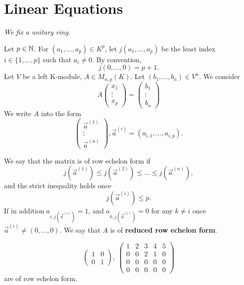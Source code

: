 \documentclass{book}
\numberwithin{equation}{section}
\begin{document}
\section{Linear Equations}
{\large\textit{We fix a unitary ring.}}
\begin{definitionenv}
    Let $p\in \mathbb{N}$. For $(a_1,\dots,a_p)\in K^p$, let $j(a_1,\dots,a_p)$ be the least index $i\in\{1,\dots,p\}$ such that $a_i\not=0$. By convention,
    $$j(0,\dots,0)=p+1.$$
    Let $V$ be a left K-module, $A\in M_{n,p}(K)$. Let $(b_1,\dots , b_n)\in V^n$. We consider
\begin{equation*}
A\begin{pmatrix}
 x_1\\
 \vdots\\
x_p
\end{pmatrix}=\begin{pmatrix}
 b_1\\
 \vdots\\
b_n
\end{pmatrix}\tag{$*$}
\end{equation*}
We write $A$ into the form
$$\begin{pmatrix}
 \vec{a}^{(1)} \\
 \vdots\\
 \vec{a}^{(n)}
\end{pmatrix}, \vec{a}^{(i)}=(a_{i,1},\dots,a_{i,p}).$$
\end{definitionenv}
\begin{definitionenv}
    We say that the matrix is of row echelon form if 
    $$j\left(\vec{a}^{(1)}\right)\le j\left(\vec{a}^{(2)}\right)\le \dots\le j\left(\vec{a}^{(n)}\right),$$
    and the strict inequality holds once $$j\left(\vec{a}^{(i)}\right)\le p.$$
    If in addition $a_{i,j\left(\vec{a}^{(i)}\right)}=1$,  and $a_{k,j\left(\vec{a}^{(i)}\right)}=0$ for any $k\not=i$ once $\vec{a}^{(i)}\not=(0,\dots,0)$. We say that $A$ is of \textbf{reduced row echelon form}. 
\end{definitionenv}
\begin{exampleenv}
    $$
    \begin{pmatrix}
        1&0\\
        0&1
    \end{pmatrix},\ 
\begin{pmatrix}
  1&2  &3  &4  &5 \\
  0& 0 &2  &1  &0 \\
  0& 0 &0  & 0 &0 \\
  0& 0 &  0&  0&0
\end{pmatrix}$$ are of row echelon form.
\end{exampleenv}
\end{document}
